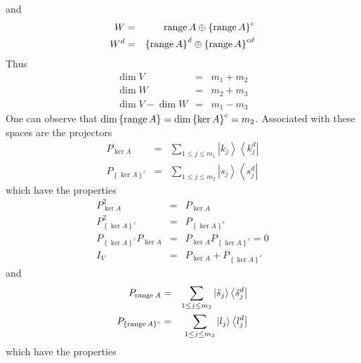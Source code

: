 and 
\begin{eqnarray}
W &=&%
\mathop{\rm range}%
A\oplus \left\{ 
\mathop{\rm range}%
A\right\} ^{c}  \nonumber \\
W^{d} &=&\left\{ 
\mathop{\rm range}%
A\right\} ^{d}\oplus \left\{ 
\mathop{\rm range}%
A\right\} ^{cd}
\end{eqnarray}%
Thus 
\begin{eqnarray}
\dim V &=&m_{1}+m_{2}  \nonumber \\
\dim W &=&m_{2}+m_{3}  \nonumber \\
\dim V-\dim W &=&m_{1}-m_{3}
\end{eqnarray}%
One can observe that $\dim \left\{ 
\mathop{\rm range}%
A\right\} =\dim \left\{ \ker A\right\} ^{c}=m_{2}$. Associated with these
spaces are the projectors 
\begin{eqnarray}
P_{\ker A} &=&\sum_{1\leq j\leq m_{1}}\left| k_{j}\right\rangle \left\langle
k_{j}^{d}\right|  \nonumber \\
P_{\left\{ \ker A\right\} ^{c}} &=&\sum_{1\leq j\leq m_{2}}\left|
s_{j}\right\rangle \left\langle s_{j}^{d}\right|
\end{eqnarray}%
which have the properties%
\begin{eqnarray}
P_{\ker A}^{2} &=&P_{\ker A}  \nonumber \\
P_{\left\{ \ker A\right\} ^{c}}^{2} &=&P_{\left\{ \ker A\right\} ^{c}} 
\nonumber \\
P_{\left\{ \ker A\right\} ^{c}}P_{\ker A} &=&P_{\ker A}P_{\left\{ \ker
A\right\} ^{c}}=0  \nonumber \\
I_{V} &=&P_{\ker A}+P_{\left\{ \ker A\right\} ^{c}}
\end{eqnarray}%
and 
\begin{eqnarray}
P_{%
\mathop{\rm range}%
A} &=&\sum_{1\leq j\leq m_{2}}\left| \tilde{s}_{j}\right\rangle \left\langle 
\tilde{s}_{j}^{d}\right|  \nonumber \\
P_{\left\{ 
\mathop{\rm range}%
A\right\} ^{c}} &=&\sum_{1\leq j\leq m_{3}}\left| l_{j}\right\rangle
\left\langle l_{j}^{d}\right|
\end{eqnarray}%
which have the properties%

